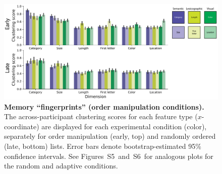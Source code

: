 \documentclass[11pt]{article}
\newcommand{\fingerprintsRandom}{S5}
\newcommand{\fingerprintsAdaptive}{S6}
\begin{document}
\begin{figure}[tp] \centering
    \includegraphics[width=\textwidth]{figures/fingerprints}
    
\caption{\textbf{Memory ``fingerprints'' (order manipulation conditions).} The
across-participant clustering scores for each feature type ($x$-coordinate) are
displayed for each experimental condition (color), separately for order
manipulation (early, top) and randomly ordered (late, bottom) lists. Error bars
denote bootstrap-estimated 95\% confidence intervals. See
Figures~\fingerprintsRandom~and~\fingerprintsAdaptive~for analogous plots for
the random and adaptive conditions.} \label{fig:fingerprints}

\end{figure}
\end{document}
